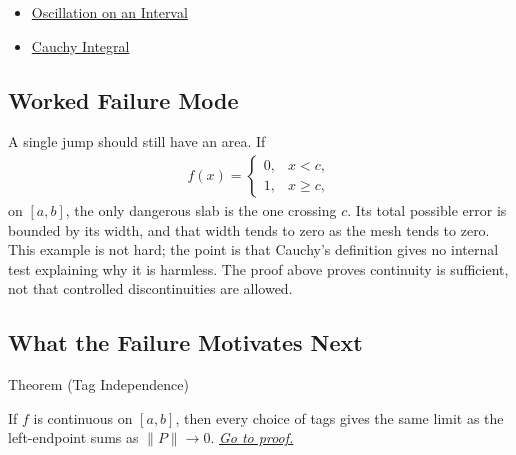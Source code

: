 \begin{dependencies}
\begin{itemize}
  \item \hyperref[def:interval-oscillation-integration]{Oscillation on an Interval}
  \item \hyperref[def:cauchy-integral]{Cauchy Integral}
\end{itemize}
\end{dependencies}

\subsection*{Worked Failure Mode}

\begin{remark*}[Interpretation]
A single jump should still have an area. If
\[
\begin{aligned}
  f(x)=
  \begin{cases}
    0,&x<c,\\
    1,&x\ge c,
  \end{cases}
\end{aligned}
\]
on \([a,b]\), the only dangerous slab is the one crossing \(c\). Its total
possible error is bounded by its width, and that width tends to zero as the
mesh tends to zero. This example is not hard; the point is that Cauchy's
definition gives no internal test explaining why it is harmless. The proof
above proves continuity is sufficient, not that controlled discontinuities are
allowed.
\end{remark*}

\subsection*{What the Failure Motivates Next}

\begin{theorembox}{Theorem (Tag Independence)}
\begin{theorem}
\label{thm:cauchy-tag-independence}

If \(f\) is continuous on \([a,b]\), then every choice of tags gives the same
limit as the left-endpoint sums as \(\|P\|\to 0\).
\hyperref[prf:cauchy-tag-independence]{\textit{Go to proof.}}
\end{theorem}
\end{theorembox}

